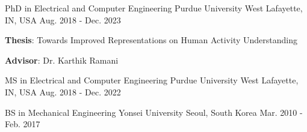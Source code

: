 


\begin{cventries}


    \cventry
    {PhD in Electrical and Computer Engineering} %
    {Purdue University} %
    {West Lafayette, IN, USA} %
    {Aug. 2018 - Dec. 2023} %
    { %
    \begin{cvitems}
        \item {\textbf{Thesis}: Towards Improved Representations on Human Activity Understanding}
        \item {\textbf{Advisor}: Dr. Karthik Ramani}
    \end{cvitems}
    }

    \cventry
    {MS in Electrical and Computer Engineering} %
    {Purdue University} %
    {West Lafayette, IN, USA} %
    {Aug. 2018 - Dec. 2022} %
    { %
    }
    \vspace{-1em}

    \cventry
    {BS in Mechanical Engineering} %
    {Yonsei University} %
    {Seoul, South Korea} %
    {Mar. 2010 - Feb. 2017} %
    { %
    }
    \vspace{-1em}

\end{cventries}
